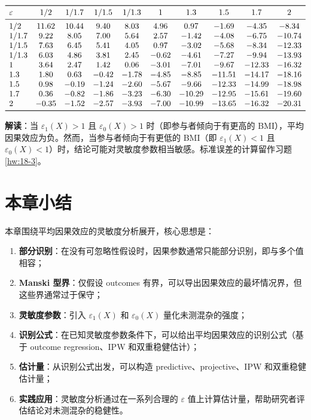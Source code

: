 \begin{table}[htbp]
\caption{平均因果效应的灵敏度分析：学校午餐计划对 BMI 的影响}\label{tbl:18-sensitivity}
\[
\begin{array}{lccccccccc}
\toprule
\varepsilon & 1/2 & 1/1.7 & 1/1.5 & 1/1.3 & 1 & 1.3 & 1.5 & 1.7 & 2 \\ \midrule
1/2   & 11.62 & 10.44 & 9.40 & 8.03 & 4.96 & 0.97 & -1.69 & -4.35 & -8.34 \\
1/1.7 & 9.22  & 8.05  & 7.00 & 5.64 & 2.57 & -1.42 & -4.08 & -6.75 & -10.74 \\
1/1.5 & 7.63  & 6.45  & 5.41 & 4.05 & 0.97 & -3.02 & -5.68 & -8.34 & -12.33 \\
1/1.3 & 6.03  & 4.86  & 3.81 & 2.45 & -0.62 & -4.61 & -7.27 & -9.94 & -13.93 \\
1     & 3.64  & 2.47  & 1.42 & 0.06 & -3.01 & -7.01 & -9.67 & -12.33 & -16.32 \\
1.3   & 1.80  & 0.63  & -0.42 & -1.78 & -4.85 & -8.85 & -11.51 & -14.17 & -18.16 \\
1.5   & 0.98  & -0.19 & -1.24 & -2.60 & -5.67 & -9.66 & -12.33 & -14.99 & -18.98 \\
1.7   & 0.36  & -0.82 & -1.86 & -3.23 & -6.30 & -10.29 & -12.95 & -15.61 & -19.60 \\
2     & -0.35 & -1.52 & -2.57 & -3.93 & -7.00 & -10.99 & -13.65 & -16.32 & -20.31 \\
\bottomrule
\end{array}
\]
\end{table}

\textbf{解读}：当 $\varepsilon_1(X) > 1$ 且 $\varepsilon_0(X) > 1$ 时（即参与者倾向于有更高的 BMI），平均因果效应为负。然而，当参与者倾向于有更低的 BMI（即 $\varepsilon_1(X) < 1$ 且 $\varepsilon_0(X) < 1$）时，结论可能对灵敏度参数相当敏感。标准误差的计算留作习题 \ref{hw:18-3}。

\section{本章小结}\label{sec:18-summary}

本章围绕平均因果效应的灵敏度分析展开，核心思想是：

\begin{enumerate}
  \item \textbf{部分识别}：在没有可忽略性假设时，因果参数通常只能部分识别，即与多个值相容；
  \item \textbf{Manski 型界}：仅假设 outcomes 有界，可以导出因果效应的最坏情况界，但这些界通常过于保守；
  \item \textbf{灵敏度参数}：引入 $\varepsilon_1(X)$ 和 $\varepsilon_0(X)$ 量化未测混杂的强度；
  \item \textbf{识别公式}：在已知灵敏度参数条件下，可以给出平均因果效应的识别公式（基于 outcome regression、IPW 和双重稳健估计）；
  \item \textbf{估计量}：从识别公式出发，可以构造 predictive、projective、IPW 和双重稳健估计量；
  \item \textbf{实践应用}：灵敏度分析通过在一系列合理的 $\varepsilon$ 值上计算估计量，帮助研究者评估结论对未测混杂的稳健性。
\end{enumerate}

